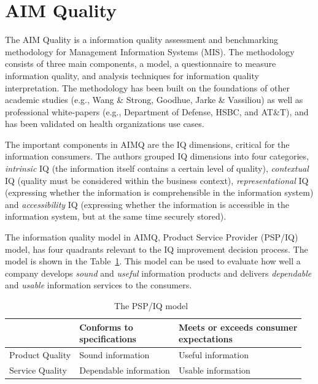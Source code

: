 \section{AIM Quality}

The AIM Quality is a information quality assessment and benchmarking methodology for Management Information Systems (MIS).
The methodology consists of three main components, a model, a questionnaire to measure information quality, and analysis techniques for information quality interpretation.
The methodology has been built on the foundations of other academic studies (e.g., Wang \& Strong, Goodhue, Jarke \& Vassiliou) as well as professional white-papers (e.g., Department of Defense, HSBC, and AT\&T), and has been validated on health organizations use cases.

The important components in AIMQ are the IQ dimensions, critical for the information consumers.
The authors grouped IQ dimensions into four categories, \textit{intrinsic} IQ (the information itself contains a certain level of quality), \textit{contextual} IQ (quality must be considered within the business context), \textit{representational} IQ (expressing whether the information is comprehensible in the information system) and \textit{accessibility} IQ (expressing whether the information is accessible in the information system, but at the same time securely stored).

The information quality model in AIMQ, Product Service Provider (PSP/IQ) model, has four quadrants relevant to the IQ improvement decision process.
The model is shown in the Table~\ref{table:psp-iq}.
This model can be used to evaluate how well a company develops \textit{sound} and \textit{useful} information products and delivers \textit{dependable} and \textit{usable} information services to the consumers.

\begin{table}[htbp]
    \centering

    \begin{tabular}{@{}l|ll@{}}
        \toprule
                        & \shortstack{Conforms to \\ specifications}    & \shortstack{Meets or exceeds consumer \\ expectations}    \\ \midrule
        Product Quality & Sound information                             & Useful information                                        \\
        Service Quality & Dependable information                        & Usable information                                        \\
        \bottomrule
    \end{tabular}

    \caption{The PSP/IQ model~\cite{lee2002}}
    \label{table:psp-iq}
\end{table}
\FloatBarrier

